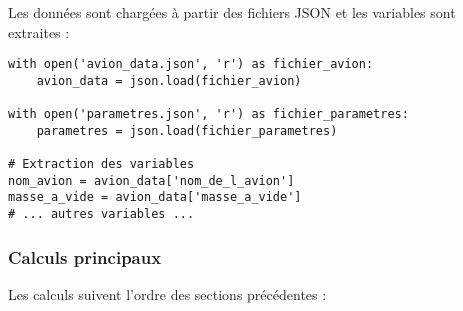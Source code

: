 \documentclass[12pt,a4paper]{article}
\begin{document}
Les données sont chargées à partir des fichiers JSON et les variables sont extraites :

\begin{verbatim}
with open('avion_data.json', 'r') as fichier_avion:
    avion_data = json.load(fichier_avion)

with open('parametres.json', 'r') as fichier_parametres:
    parametres = json.load(fichier_parametres)

# Extraction des variables
nom_avion = avion_data['nom_de_l_avion']
masse_a_vide = avion_data['masse_a_vide']
# ... autres variables ...
\end{verbatim}

\subsubsection{Calculs principaux}

Les calculs suivent l'ordre des sections précédentes :
\end{document}
